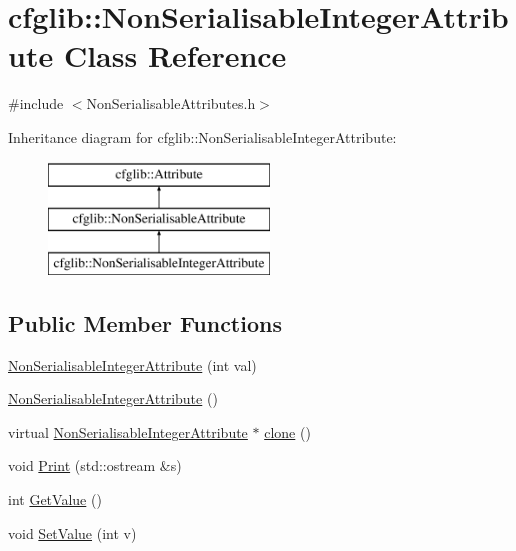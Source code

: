\hypertarget{classcfglib_1_1NonSerialisableIntegerAttribute}{}\section{cfglib\+:\+:Non\+Serialisable\+Integer\+Attribute Class Reference}
\label{classcfglib_1_1NonSerialisableIntegerAttribute}


{\ttfamily \#include $<$Non\+Serialisable\+Attributes.\+h$>$}

Inheritance diagram for cfglib\+:\+:Non\+Serialisable\+Integer\+Attribute\+:\begin{figure}[H]
\begin{center}
\leavevmode
\includegraphics[height=3.000000cm]{classcfglib_1_1NonSerialisableIntegerAttribute}
\end{center}
\end{figure}
\subsection*{Public Member Functions}
\begin{DoxyCompactItemize}
\item 
\hyperlink{classcfglib_1_1NonSerialisableIntegerAttribute_a3500f80644bc62dcb3f4fcdaa47b5cc5}{Non\+Serialisable\+Integer\+Attribute} (int val)
\item 
\hyperlink{classcfglib_1_1NonSerialisableIntegerAttribute_a8242a4ef17361a5de82ed15130a78487}{Non\+Serialisable\+Integer\+Attribute} ()
\item 
virtual \hyperlink{classcfglib_1_1NonSerialisableIntegerAttribute}{Non\+Serialisable\+Integer\+Attribute} $\ast$ \hyperlink{classcfglib_1_1NonSerialisableIntegerAttribute_ab37d2f2a349d73177e6fdbd1356566ab}{clone} ()
\item 
void \hyperlink{classcfglib_1_1NonSerialisableIntegerAttribute_ade6c5738723b606295a2cf14fe568247}{Print} (std\+::ostream \&s)
\item 
int \hyperlink{classcfglib_1_1NonSerialisableIntegerAttribute_aeb200350a5746f7fe535ca4db1642e9d}{Get\+Value} ()
\item 
void \hyperlink{classcfglib_1_1NonSerialisableIntegerAttribute_a7bff73325941157e314046c31f266d2a}{Set\+Value} (int v)
\end{DoxyCompactItemize}
